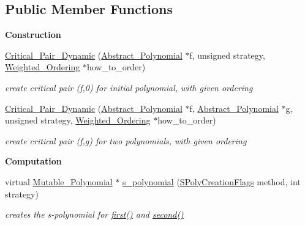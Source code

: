 \subsection*{Public Member Functions}
\begin{Indent}\textbf{ Construction}\par
\begin{DoxyCompactItemize}
\item 
\mbox{\label{class_critical___pair___dynamic_a15c39a5bfb77e3a8ba8572cadfbe35d6}} 
\hyperlink{class_critical___pair___dynamic_a15c39a5bfb77e3a8ba8572cadfbe35d6}{Critical\+\_\+\+Pair\+\_\+\+Dynamic} (\hyperlink{class_abstract___polynomial}{Abstract\+\_\+\+Polynomial} $\ast$f, unsigned strategy, \hyperlink{class_weighted___ordering}{Weighted\+\_\+\+Ordering} $\ast$how\+\_\+to\+\_\+order)
\begin{DoxyCompactList}\small\item\em create critical pair (f,0) for initial polynomial, with given ordering \end{DoxyCompactList}\item 
\mbox{\label{class_critical___pair___dynamic_a102de04e499da77fcae6072cab2cc45e}} 
\hyperlink{class_critical___pair___dynamic_a102de04e499da77fcae6072cab2cc45e}{Critical\+\_\+\+Pair\+\_\+\+Dynamic} (\hyperlink{class_abstract___polynomial}{Abstract\+\_\+\+Polynomial} $\ast$f, \hyperlink{class_abstract___polynomial}{Abstract\+\_\+\+Polynomial} $\ast$g, unsigned strategy, \hyperlink{class_weighted___ordering}{Weighted\+\_\+\+Ordering} $\ast$how\+\_\+to\+\_\+order)
\begin{DoxyCompactList}\small\item\em create critical pair (f,g) for two polynomials, with given ordering \end{DoxyCompactList}\end{DoxyCompactItemize}
\end{Indent}
\begin{Indent}\textbf{ Computation}\par
\begin{DoxyCompactItemize}
\item 
virtual \hyperlink{class_mutable___polynomial}{Mutable\+\_\+\+Polynomial} $\ast$ \hyperlink{class_critical___pair___dynamic_acaeda6e006f9d9785e28fa5b6bbf49e9}{s\+\_\+polynomial} (\hyperlink{group___g_b_computation_ga73257b8a2d5cc826853a71b77d0cebf2}{S\+Poly\+Creation\+Flags} method, int strategy)
\begin{DoxyCompactList}\small\item\em creates the s-\/polynomial for \hyperlink{class_critical___pair___basic_a6e251e3724fde2c610d921f93889eb67}{first()} and \hyperlink{class_critical___pair___basic_a06da1cbbe1451962b68f2bbf90855fae}{second()} \end{DoxyCompactList}\end{DoxyCompactItemize}
\end{Indent}
